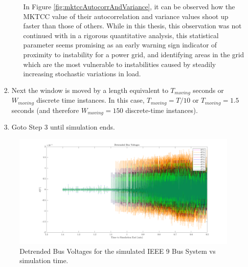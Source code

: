 \begin{enumerate}
\begin{enumerate}
\begin{equation}
			\end{equation}
			In Figure \ref{fig:mktccAutocorrAndVariance}, it can be observed how the MKTCC value of their autocorrelation and variance values shoot up faster than those of others. While in this thesis, this observation was not continued with in a rigorous quantitative analysis, this statistical parameter seems promising as an early warning sign indicator of proximity to instability for a power grid, and identifying areas in the grid which are the most vulnerable to instabilities caused by steadily increasing stochastic variations in load.
		\end{enumerate}
	
	\item Next the window is moved by a length equivalent to $T_{moving}$ seconds or $W_{moving}$ discrete time instances. In this case, $T_{moving} = T/10$ or $T_{moving} = 1.5$ seconds (and therefore $W_{moving} = 150$ discrete-time instances).
	
	\item Goto Step 3 until simulation ends.
\end{enumerate}

\begin{figure}[!htpb]
	\centering
	\includegraphics[scale=0.25]{../figures/analysis_matlab/voltsDetrended_run02}
	\caption{Detrended Bus Voltages for the simulated IEEE 9 Bus System vs simulation time.}
	\label{fig:detrendedBusVoltages}
\end{figure}

